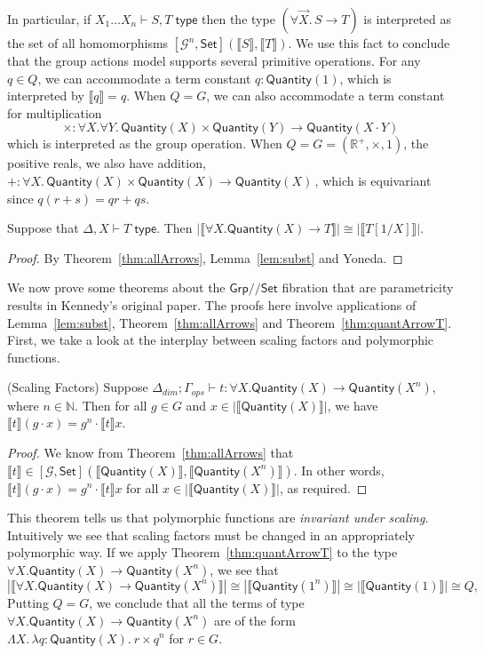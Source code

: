 \documentclass[a4paper,UKenglish]{lipics}
\theoremstyle{plain}
\newcommand{\msf}[1]{\mathsf{#1}} %
\newcommand{\Grp}{\msf{Grp}}
\newcommand{\Set}{\msf{Set}}
\newcommand{\GroupSet}[1]{[#1,\Set]}
\newcommand{\Lslice}[1]{#1/\!/\Set}
\newcommand{\GrpSet}{\Lslice{\Grp}}
\newcommand{\sem}[1]{\ensuremath{\llbracket #1 \rrbracket}}
\newcommand{\qnt}{\msf{Quantity}}
\newcommand{\Deltadim}{\ensuremath{\Delta_{dim}}}
\newcommand{\Gammaops}{\ensuremath{\Gamma_{ops}}}
\newcommand{\Tj}[2]{#1 \vdash #2 \; \msf{ type}}
\begin{document}
In particular, if $\Tj{X_1\dots X_n} {S,T}$ then
the type $(\forall \vec X.\,S\to T)$ is interpreted as the set
of all homomorphisms $\GroupSet {\mathcal G^n}(\sem S,\sem T)$.
We use this fact to conclude that the group actions model supports
several primitive operations. For any $q\in Q$, we can accommodate
a term constant $q:\qnt(1)$, which is interpreted by $\sem q=q$.
When $Q=G$,
we can also accommodate a term constant for multiplication
\[\times :\forall X.\forall Y.\,\qnt(X)\times\qnt(Y)\to\qnt(X\cdot Y)\]
which is interpreted as the group operation.
When $Q=G=(\mathbb R^+,\times,1)$, the positive reals,
we also have addition,
\ $+ :\forall X.\,\qnt(X)\times\qnt(X)\to\qnt(X)$\,,
which is equivariant since $q(r+s)=qr+qs$.
\begin{theorem}
\label{thm:quantArrowT}
Suppose that $\Delta, X \vdash T \; \msf{ type}$. Then $|\sem{\forall
  X . \qnt(X) \rightarrow T}| \cong |\sem{T[1/X]}|$.
\end{theorem}
\begin{proof}
 By Theorem~\ref{thm:allArrows}, Lemma~\ref{lem:subst} and Yoneda.
\end{proof}



We now prove some theorems about the $\GrpSet$ fibration that are parametricity results in Kennedy's original paper. The proofs here involve applications of Lemma~\ref{lem:subst}, Theorem~\ref{thm:allArrows} and Theorem~\ref{thm:quantArrowT}. First, we take a look at the interplay between scaling factors and polymorphic functions.

\begin{theorem}(Scaling Factors)
\label{thm:ScalFact}
Suppose $\Deltadim; \Gammaops \vdash t : \forall X. \qnt(X) \rightarrow \qnt(X^n)$, where $n\in \mathbb{N}$. Then for all $g \in G$ and $x \in |\sem{\qnt(X)}|$,
we have $\sem{t} (g \cdot x) = g^n \cdot \sem{t} x$.
\end{theorem}
\begin{proof}
We know from Theorem~\ref{thm:allArrows} that
$\sem{t} \in \GroupSet{\mathcal{G}}(\sem{\qnt(X)},\sem{\qnt(X^n)})$.
In other words, $\sem{t} (g \cdot x) = g^n \cdot \sem{t} x$ for all $x \in |\sem{\qnt(X)}|$, as required.
\end{proof}
This theorem tells us that polymorphic functions are \emph{invariant under scaling}. Intuitively we see that scaling factors must be changed in an appropriately polymorphic way.
%
If we apply Theorem~\ref{thm:quantArrowT} to the type $\forall X. \qnt(X)\rightarrow \qnt(X^n)$, we see that
\[
 |\sem{\forall X. \qnt(X)\rightarrow \qnt(X^n)}| \cong |\sem{\qnt(1^n)}| \cong |\sem{\qnt(1)}| \cong Q \text{,}
\]
Putting $Q=G$, we conclude that all the terms of type $\forall X. \qnt(X)\rightarrow \qnt(X^n)$
are of the form $\Lambda X.\,\lambda q:\qnt(X).\ r\times q^n$
for $r\in G$.
\end{document}
